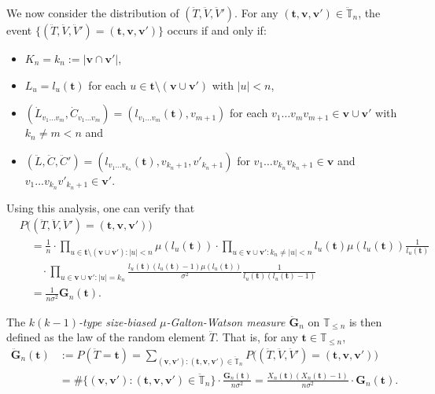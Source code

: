 \documentclass[12pt,a4paper]{amsart}
\numberwithin{equation}{section}
\begin{document}
	We now consider the distribution of $(\ddot T,\ddot V,\ddot V')$.
	For any $( \mathbf t , \mathbf v, \mathbf v')\in\ddot {\mathbb T}_n$, the event $\{(\ddot T,\ddot V,\ddot V')=( \mathbf t , \mathbf v, \mathbf v')\}$ occurs if and only if:
\begin{itemize}
\item
    $K_n=k_n:=| \mathbf v\cap \mathbf v'|$,
\item
    $L_u=l_u( \mathbf t )$ for each $u\in  \mathbf t \setminus( \mathbf v\cup \mathbf v')$ with $| u| <n$,
\item
	$(\dot L_{v_1\dots v_m},\dot C_{v_1\dots v_m})=(l_{v_1\dots v_m}( \mathbf t ),v_{m+1})$ for each $v_1\dots v_mv_{m+1}\in \mathbf v\cup \mathbf v'$ with $k_n\neq m<n$ and
\item
	$(\ddot L,\ddot C,\ddot C')=(l_{v_1\dots v_{k_n}}( \mathbf t ),v_{k_n+1},v'_{k_n+1})$ for $v_1\dots v_{k_n}v_{k_n+1}\in \mathbf v$ and $v_1\dots v_{k_n}v'_{k_n+1}\in \mathbf v'$.
\end{itemize}
	Using this analysis, one can verify that
\begin{align*}
		&P\big((\ddot T,\ddot V,\ddot V')=( \mathbf t , \mathbf v, \mathbf v')\big)\\
	&\quad= \frac{1}{n} \cdot \prod_{u\in  \mathbf t \setminus( \mathbf v\cup  \mathbf v'):|u|<n} \mu(l_u( \mathbf t )) \cdot \prod_{u\in  \mathbf v\cup  \mathbf v':k_n\neq|u|<n}l_u( \mathbf t ) \mu(l_u( \mathbf t ))\frac{1}{l_u( \mathbf t )}
    \\&\qquad \cdot \prod_{u\in  \mathbf v \cup  \mathbf v':|u|=k_n}\frac{l_u( \mathbf t )(l_u( \mathbf t )-1) \mu(l_u( \mathbf t ))}{\sigma^2}\frac{1}{l_u( \mathbf t )(l_u( \mathbf t )-1)}\\
	&\quad = \frac{1}{n\sigma^2} \mathbf G_n( \mathbf t ).
\end{align*}
	
	The \emph{$k(k-1)$-type size-biased $\mu$-Galton-Watson measure $\ddot{\mathbf G}_n$} on $\mathbb T_{\leq n}$ is then defined as the law of the random element $\ddot T$. That is, for any $ \mathbf t \in\mathbb T_{\leq n}$,
\begin{equation}
\label{eq:k(k-1)typesizebiasedGWmeasure}
\begin{split}
		\ddot{\mathbf G}_n( \mathbf t )
	&:= P(\ddot T= \mathbf t )
	= \sum_{( \mathbf v, \mathbf v'):( \mathbf t , \mathbf v, \mathbf v')\in \ddot {\mathbb T}_n} P\big((\ddot T,\ddot V,\ddot V')=( \mathbf t , \mathbf v, \mathbf v')\big)
	\\&= \#\{( \mathbf v, \mathbf v'):( \mathbf t , \mathbf v, \mathbf v')\in \ddot {\mathbb T}_n\} \cdot \frac{\mathbf G_n( \mathbf t )}{n\sigma^2}
	= \frac{X_n( \mathbf t )(X_n( \mathbf t )-1)}{n\sigma^2} \cdot{\mathbf G}_n( \mathbf t ).
\end{split}
\end{equation}
\end{document}

